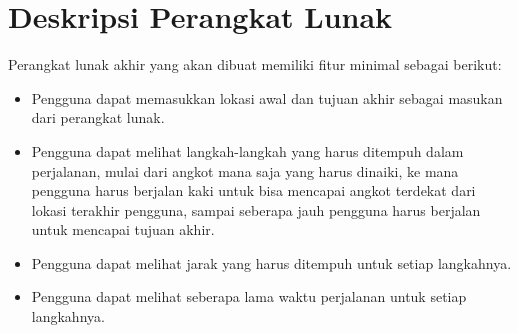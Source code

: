 \documentclass[a4paper,twoside]{article}
\begin{document}
\section{Deskripsi Perangkat Lunak}
\label{sec:description}
Perangkat lunak akhir yang akan dibuat memiliki fitur minimal sebagai berikut:
\begin{itemize}
	\item Pengguna dapat memasukkan lokasi awal dan tujuan akhir sebagai masukan dari perangkat lunak.
	\item Pengguna dapat melihat langkah-langkah yang harus ditempuh dalam perjalanan, mulai dari angkot mana saja yang harus dinaiki, ke mana pengguna harus berjalan kaki untuk bisa mencapai angkot terdekat dari lokasi terakhir pengguna, sampai seberapa jauh pengguna harus berjalan untuk mencapai tujuan akhir.
	\item Pengguna dapat melihat jarak yang harus ditempuh untuk setiap langkahnya.
	\item Pengguna dapat melihat seberapa lama waktu perjalanan untuk setiap langkahnya.
\end{itemize}
\end{document}

